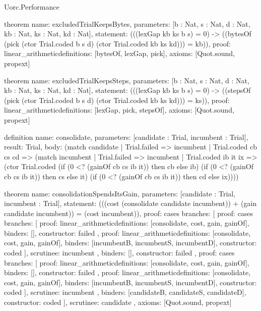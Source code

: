 \begin{lexlean}{Uorc.Performance}
\begin{semanticmodule}
theorem{
  name: excludedTrialKeepsBytes,
  parameters: [b : Nat, s : Nat, d : Nat, kb : Nat, ks : Nat, kd : Nat],
  statement: (((lexGap kb ks b s) = 0) -> ((bytesOf (pick (ctor Trial.coded b s d) (ctor Trial.coded kb ks kd))) = kb)),
  proof: linear_arithmetic{definitions: [bytesOf, lexGap, pick]},
  axioms: [Quot.sound, propext]
}

theorem{
  name: excludedTrialKeepsSteps,
  parameters: [b : Nat, s : Nat, d : Nat, kb : Nat, ks : Nat, kd : Nat],
  statement: (((lexGap kb ks b s) = 0) -> ((stepsOf (pick (ctor Trial.coded b s d) (ctor Trial.coded kb ks kd))) = ks)),
  proof: linear_arithmetic{definitions: [lexGap, pick, stepsOf]},
  axioms: [Quot.sound, propext]
}

definition{
  name: consolidate,
  parameters: [candidate : Trial, incumbent : Trial],
  result: Trial,
  body: (match candidate
    | Trial.failed => incumbent
    | Trial.coded cb cs cd => (match incumbent
      | Trial.failed => incumbent
      | Trial.coded ib it ix => (ctor Trial.coded (if (0 <? (gainOf cb cs ib it)) then cb else ib) (if (0 <? (gainOf cb cs ib it)) then cs else it) (if (0 <? (gainOf cb cs ib it)) then cd else ix))))
}

theorem{
  name: consolidationSpendsItsGain,
  parameters: [candidate : Trial, incumbent : Trial],
  statement: (((cost (consolidate candidate incumbent)) + (gain candidate incumbent)) = (cost incumbent)),
  proof: cases{
    branches: [
      {
        proof: cases{
          branches: [
            {
              proof: linear_arithmetic{definitions: [consolidate, cost, gain, gainOf]},
              binders: [],
              constructor: failed
            },
            {
              proof: linear_arithmetic{definitions: [consolidate, cost, gain, gainOf]},
              binders: [incumbentB, incumbentS, incumbentD],
              constructor: coded
            }
          ],
          scrutinee: incumbent
        },
        binders: [],
        constructor: failed
      },
      {
        proof: cases{
          branches: [
            {
              proof: linear_arithmetic{definitions: [consolidate, cost, gain, gainOf]},
              binders: [],
              constructor: failed
            },
            {
              proof: linear_arithmetic{definitions: [consolidate, cost, gain, gainOf]},
              binders: [incumbentB, incumbentS, incumbentD],
              constructor: coded
            }
          ],
          scrutinee: incumbent
        },
        binders: [candidateB, candidateS, candidateD],
        constructor: coded
      }
    ],
    scrutinee: candidate
  },
  axioms: [Quot.sound, propext]
}


\end{semanticmodule}
\end{lexlean}
